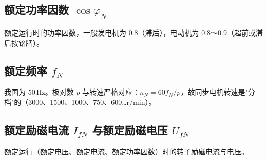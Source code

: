 \subsection{额定功率因数 $\cos\varphi_N$}
额定运行时的功率因数，一般发电机为 0.8（滞后），电动机为 0.8～0.9（超前或滞后按铭牌）。

\subsection{额定频率 $f_N$}
我国为 50\,Hz。极对数 $p$ 与转速严格对应：$n_N=60f_N/p$，故同步电机转速是"分档"的（3000、1500、1000、750、600…r/min）。

\subsection{额定励磁电流 $I_{fN}$ 与额定励磁电压 $U_{fN}$}
额定运行（额定电压、额定电流、额定功率因数）时的转子励磁电流与电压。


